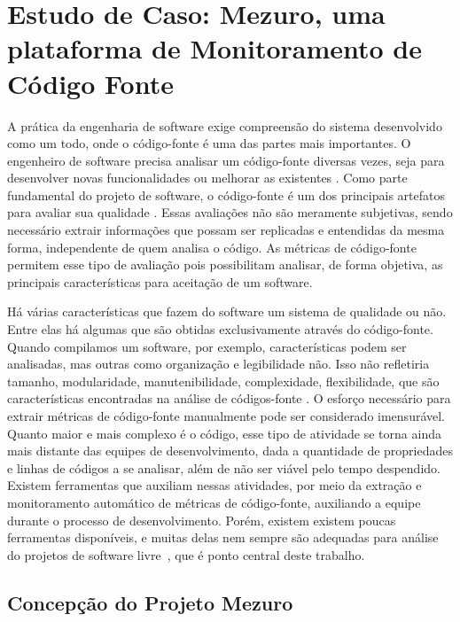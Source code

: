 \chapter{Estudo de Caso: Mezuro, uma plataforma de Monitoramento de Código Fonte}

A prática da engenharia de software exige compreensão do sistema desenvolvido como um todo, onde o código-fonte é uma das partes mais importantes. O engenheiro de software precisa analisar um código-fonte diversas vezes, seja para desenvolver novas funcionalidades ou melhorar as existentes \cite{meirelles2010mezuro}.
%
Como parte fundamental do projeto de software, o código-fonte é um dos principais artefatos para avaliar sua qualidade \cite{meirelles2009crab}. Essas avaliações não são meramente subjetivas, sendo necessário extrair informações que possam ser replicadas e entendidas da mesma forma, independente de quem analisa o código. As métricas de código-fonte permitem esse tipo de avaliação pois possibilitam analisar, de forma objetiva, as principais características para aceitação de um software.

Há várias características que fazem do software um sistema de qualidade ou não. Entre elas há algumas que são obtidas exclusivamente através do código-fonte. Quando compilamos um software, por exemplo, características podem ser analisadas, mas outras como organização e legibilidade não. Isso não refletiria tamanho, modularidade, manutenibilidade, complexidade, flexibilidade, que são características encontradas na análise de códigos-fonte \cite{meirelles2013metrics}.
%
O esforço necessário para extrair métricas de código-fonte manualmente pode ser considerado imensurável. Quanto maior e mais complexo é o código, esse tipo de atividade se torna ainda mais distante das equipes de desenvolvimento, dada a quantidade de propriedades e linhas de códigos a se analisar, além de não ser viável pelo tempo despendido. 
%
Existem ferramentas que auxiliam nessas atividades, por meio da extração e monitoramento automático de métricas de código-fonte, auxiliando  a equipe durante o processo de desenvolvimento. Porém, existem existem poucas ferramentas disponíveis, e muitas delas nem sempre são adequadas para análise do projetos de software livre~\cite{meirelles2010mezuro}, que é ponto central deste trabalho.

\section{Concepção do Projeto Mezuro}

